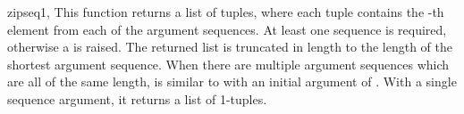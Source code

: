 \begin{funcdesc}{zip}{seq1, \moreargs}
  This function returns a list of tuples, where each tuple contains
  the -th element from each of the argument sequences.  At
  least one sequence is required, otherwise a  is
  raised.  The returned list is truncated in length to the length of
  the shortest argument sequence.  When there are multiple argument
  sequences which are all of the same length,  is
  similar to  with an initial argument of .
  With a single sequence argument, it returns a list of 1-tuples.
\end{funcdesc}
